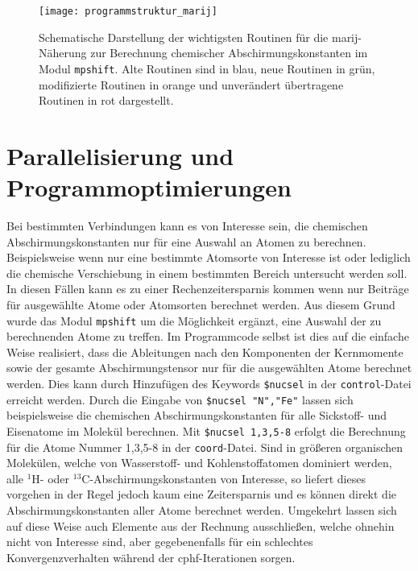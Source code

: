 \begin{figure}[ht!]
\centering
\texttt{[image: programmstruktur\_marij]}
\captionsetup{figurewithin = chapter}
\captionsetup{font=small, labelfont=bf}\caption[\ac{marij}-Routinen für chemische Abschirmungskonstanten]{Schematische Darstellung der wichtigsten Routinen für die \ac{marij}-Näherung zur Berechnung chemischer Abschirmungskonstanten im Modul \texttt{mpshift}. Alte Routinen sind in blau, neue Routinen in grün, modifizierte Routinen in orange und unverändert übertragene Routinen in rot dargestellt.}
\label{abb:programmstrukur_marij}
\end{figure}



\section{Parallelisierung und Programmoptimierungen}\label{paraopt}
Bei bestimmten Verbindungen kann es von Interesse sein, die chemischen Abschirmungskonstanten nur für eine Auswahl an Atomen zu berechnen. Beispielsweise wenn nur eine bestimmte Atomsorte von Interesse ist oder lediglich die chemische Verschiebung in einem bestimmten Bereich untersucht werden soll. In diesen Fällen kann es zu einer Rechenzeitersparnis kommen wenn nur Beiträge für ausgewählte Atome oder Atomsorten berechnet werden. Aus diesem Grund wurde das Modul \texttt{mpshift} um die Möglichkeit ergänzt, eine Auswahl der zu berechnenden Atome zu treffen. Im Programmcode selbst ist dies auf die einfache Weise realisiert, dass die Ableitungen nach den Komponenten der Kernmomente sowie der gesamte Abschirmungstensor nur für die ausgewählten Atome berechnet werden. Dies kann durch Hinzufügen des Keywords \texttt{\$nucsel} in der \texttt{control}-Datei erreicht werden. Durch die Eingabe von \texttt{\$nucsel "N","Fe"} lassen sich beispielsweise die chemischen Abschirmungskonstanten für alle Sickstoff- und Eisenatome im Molekül berechnen. Mit \texttt{\$nucsel 1,3,5-8} erfolgt die Berechnung für die Atome Nummer 1,3,5-8 in der \texttt{coord}-Datei. Sind in größeren organischen Molekülen, welche von Wasserstoff- und Kohlenstoffatomen dominiert werden, alle $^1$H- oder $^{13}$C-Abschirmungskonstanten von Interesse, so liefert dieses vorgehen in der Regel jedoch kaum eine Zeitersparnis und es können direkt die Abschirmungskonstanten aller Atome berechnet werden. Umgekehrt lassen sich auf diese Weise auch Elemente aus der Rechnung ausschließen, welche ohnehin nicht von Interesse sind, aber gegebenenfalls für ein schlechtes Konvergenzverhalten während der \ac{cphf}-Iterationen sorgen.

